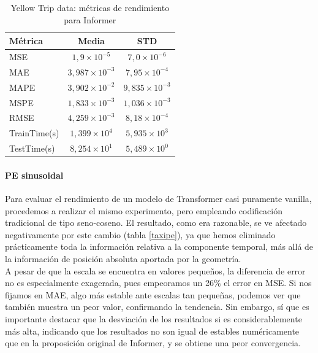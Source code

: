 \begin{table}[!ht]
	\centering
	\begin{tabular}{l|c|c}
		\toprule
		Métrica & Media & STD \\
		\midrule
		MSE & $1,9 \times 10^{-5}$ & $7,0 \times 10^{-6}$ \\
		MAE & $3,987 \times 10^{-3}$ & $7,95 \times 10^{-4}$ \\
		MAPE & $3,902 \times 10^{-2}$ & $9,835 \times 10^{-3}$ \\
		MSPE & $1,833 \times 10^{-3}$ & $1,036 \times 10^{-3}$ \\
		RMSE & $4,259 \times 10^{-3}$ & $8,18 \times 10^{-4}$ \\
		TrainTime(s) & $1,399 \times 10^{4}$ & $5,935 \times 10^{3}$ \\
		TestTime(s) & $8,254 \times 10^{1}$ & $5,489 \times 10^{0}$ \\
		\bottomrule
	\end{tabular}
	\caption{Yellow Trip data: métricas de rendimiento para Informer}
	\label{taxiinformer}
\end{table}

\paragraph{PE sinusoidal}

Para evaluar el rendimiento de un modelo de Transformer casi puramente vanilla, procedemos a realizar el mismo experimento, pero empleando codificación tradicional de tipo seno-coseno. El resultado, como era razonable, se ve afectado negativamente por este cambio (tabla \ref{taxipe}), ya que hemos eliminado prácticamente toda la información relativa a la componente temporal, más allá de la información de posición absoluta aportada por la geometría.\\

A pesar de que la escala se encuentra en valores pequeños, la diferencia de error no es especialmente exagerada, pues empeoramos un 26\% el error en MSE. Si nos fijamos en MAE, algo más estable ante escalas tan pequeñas, podemos ver que también muestra un peor valor, confirmando la tendencia. Sin embargo, sí que es importante destacar que la desviación de los resultados si es considerablemente más alta, indicando que los resultados no son igual de estables numéricamente que en la proposición original de Informer, y se obtiene una peor convergencia.\\

